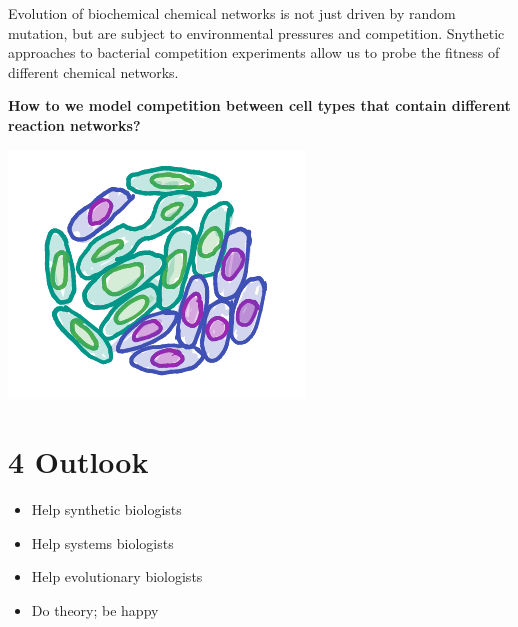 \documentclass[a0,portrait]{a0poster}
\begin{document}
\normalsize
Evolution of biochemical chemical networks is not just driven by random mutation,
but are subject to environmental pressures and competition. Snythetic approaches
to bacterial competition experiments \cite{} allow us to probe the fitness of
different chemical networks.
\medbreak
\begin{tcolorbox}[boxrule=2pt,arc=3.4pt,boxsep=2mm]
\begin{center}\color{DarkRed}
\textbf{How to we model competition between cell types that contain
different reaction networks?}
\end{center}
\end{tcolorbox}
\begin{center}
\includegraphics[width=0.9\linewidth]{competition}
\end{center}
\section*{4 Outlook}
\begin{itemize}
	\item Help synthetic biologists
	\item Help systems biologists
	\item Help evolutionary biologists
	\item Do theory; be happy
\end{itemize}
\end{document}

